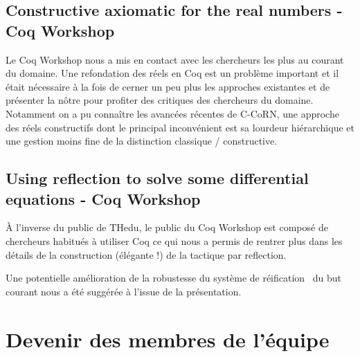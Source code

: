 \documentclass[11pt]{article}
\begin{document}
\subsection{Constructive axiomatic for the real numbers - Coq Workshop}

Le Coq Workshop nous a mis en contact avec les chercheurs les plus au courant du
domaine. Une refondation des réels en Coq est un problème important et il était
nécessaire à la fois de cerner un peu plus les approches existantes et de présenter
la nôtre pour profiter des critiques des chercheurs du domaine. Notamment on a pu
connaître les avancées récentes de C-CoRN, une approche des réels constructifs dont
le principal inconvénient est sa lourdeur hiérarchique et une gestion moins fine
de la distinction classique / constructive.

\subsection{Using reflection to solve some differential equations - Coq Workshop}

À l'inverse du public de THedu, le public du Coq Workshop est composé de chercheurs
habitués à utiliser Coq ce qui nous a permis de rentrer plus dans les détails de la
construction (élégante !) de la tactique par reflection.

Une potentielle amélioration de la robustesse du système de réification~\cite{adhoc}
du but courant nous a été suggérée à l'issue de la présentation.

\section{Devenir des membres de l'équipe}





\end{document}
